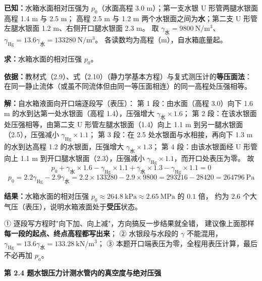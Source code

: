 \begin{jie}
\textbf{已知：}水箱水面相对压强为 $p_0$（水面高程 3.0 m）；第一支水银 U 形管两腿水银面高程 1.4 m 与 2.5 m；
高程 2.5 m 与 1.2 m 两个水银面之间为\textbf{水}；第二支 U 形管左腿水银面 1.2 m、右侧开口腿水银面 2.3 m。
取 $\gamma_{\text{水}}=9800\ \mathrm{N/m^3}$、$\gamma_{\text{Hg}}=13.6\gamma_{\text{水}}=133280\ \mathrm{N/m^3}$。
各读数均为高程（m），自水箱底量起。

\textbf{求：}水箱水面的相对压强 $p_0$。

\textbf{依据：}教材式（2.9）、式（2.10）（静力学基本方程）与复式测压计的\textbf{等压面法}：
在同一静止流体（或虽不同流体但由同一等压面相连）的同一高程处压强相等。

\textbf{解：}自水箱液面向开口端逐段写（表压）：
第 1 段：由水面（高程 3.0）向下 1.6 m 的水到达第一处水银面（高程 1.4），压强增大 $\gamma_{\text{水}}\times1.6$；
第 2 段：在该水银面处压强相等，由第二支 U 形管左腿水银面（1.4）向上 1.1 m 到另一腿水银面（2.5），压强减小 $\gamma_{\text{Hg}}\times1.1$；
第 3 段：在 2.5 处水银面与水相接，再向下 1.3 m 的水到达高程 1.2 的水银面，压强增大 $\gamma_{\text{水}}\times1.3$；
第 4 段：由该水银面经 U 形管向上 1.1 m 到开口腿水银面（2.3），压强减小 $\gamma_{\text{Hg}}\times1.1$，而开口处表压为零。
故
\[ p_0+\gamma_{\text{水}}\times1.6-\gamma_{\text{Hg}}\times1.1+\gamma_{\text{水}}\times1.3-\gamma_{\text{Hg}}\times1.1=0 \]
\[ p_0=2.2\gamma_{\text{Hg}}-2.9\gamma_{\text{水}}=2.2\times133280-2.9\times9800=293216-28420=264796\ \mathrm{Pa} \]

\textbf{结果：}水箱水面的相对压强 $p_0\approx264.8\ \mathrm{kPa}\approx2.65\ \mathrm{MPa}$ 的 $0.1$ 倍，
约为 2.6 个大气压（表压），说明水箱液面处于\textbf{受压}状态。
\end{jie}

\begin{yicuo}
① 逐段写方程时"向下加、向上减"，方向搞反一步结果就全错，
建议像上面那样\textbf{每一段的起点、终点高程都写出来}；
② 水银段与水段的 $\gamma$ 不能混用，$\gamma_{\text{Hg}}=13.6\gamma_{\text{水}}=133.28\ \mathrm{kN/m^3}$；
③ 本题开口端表压为零，全程用表压计算，最后不必再加 $p_a$。
\end{yicuo}

\noindent\textbf{第 2.4 题\quad 水银压力计测水管内的真空度与绝对压强}

